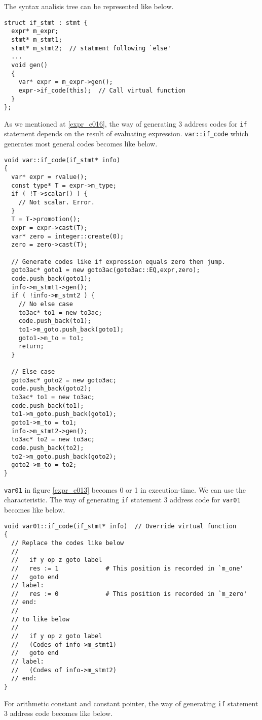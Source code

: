 The syntax analisis tree can be represented like below.
\begin{verbatim}
struct if_stmt : stmt {
  expr* m_expr;
  stmt* m_stmt1;
  stmt* m_stmt2;  // statment following `else'
  ...
  void gen()
  {
    var* expr = m_expr->gen();
    expr->if_code(this);  // Call virtual function
  }
};
\end{verbatim}
As we mentioned at \ref{expr_e016}, the way of generating 3 address
codes for {\tt{if}} statement depends on the result of evaluating 
expression. {\tt{var::if\_code}} which generates most general codes
becomes like below.
\begin{verbatim}
void var::if_code(if_stmt* info)
{
  var* expr = rvalue();
  const type* T = expr->m_type;
  if ( !T->scalar() ) {
    // Not scalar. Error.
  }
  T = T->promotion();
  expr = expr->cast(T);
  var* zero = integer::create(0);
  zero = zero->cast(T);

  // Generate codes like if expression equals zero then jump.
  goto3ac* goto1 = new goto3ac(goto3ac::EQ,expr,zero);
  code.push_back(goto1);
  info->m_stmt1->gen();
  if ( !info->m_stmt2 ) {
    // No else case
    to3ac* to1 = new to3ac;
    code.push_back(to1);
    to1->m_goto.push_back(goto1);
    goto1->m_to = to1;
    return;
  }

  // Else case
  goto3ac* goto2 = new goto3ac;
  code.push_back(goto2);
  to3ac* to1 = new to3ac;
  code.push_back(to1);
  to1->m_goto.push_back(goto1);
  goto1->m_to = to1;
  info->m_stmt2->gen();
  to3ac* to2 = new to3ac;
  code.push_back(to2);
  to2->m_goto.push_back(goto2);
  goto2->m_to = to2;
}
\end{verbatim}
{\tt{var01}} in figure \ref{expr_e013} becomes 0 or 1 in
execution-time. We can use the characteristic.
The way of generating {\tt{if}} statement 3 address code for {\tt{var01}} 
becomes like below.
\begin{verbatim}
void var01::if_code(if_stmt* info)  // Override virtual function
{
  // Replace the codes like below
  //
  //   if y op z goto label
  //   res := 1             # This position is recorded in `m_one'
  //   goto end
  // label:
  //   res := 0             # This position is recorded in `m_zero'
  // end:
  //
  // to like below
  //
  //   if y op z goto label
  //   (Codes of info->m_stmt1)
  //   goto end
  // label:
  //   (Codes of info->m_stmt2)
  // end:
}
\end{verbatim}
For arithmetic constant and constant pointer,
the way of generating {\tt{if}} statement 3 address code
becomes like below.

